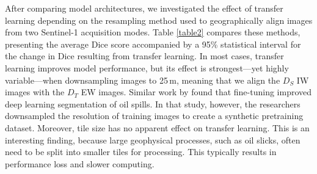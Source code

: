 \documentclass[lettersize,journal]{IEEEtran}
\begin{document}
After comparing model architectures, we investigated the effect of transfer learning depending on the resampling method used to geographically align images from two Sentinel-1 acquisition modes. Table \ref{table2} 
compares these methods, presenting the average Dice score accompanied by a 95\% statistical interval for the change in Dice resulting from transfer learning. In most cases, transfer learning improves model performance, 
but its effect is strongest—yet highly variable—when downsampling images to 25\,m, meaning that we align the $\mathit{D}_S$ IW images with the $\mathit{D}_T$ EW images. Similar work by 
\cite{bianchiLargeScaleDetectionCategorization2020a} found that fine-tuning improved deep learning segmentation of oil spills. In that study, however, the researchers downsampled the resolution of training images to create a 
synthetic pretraining dataset.
Moreover, tile size has no apparent effect on transfer learning. This is an interesting finding, because large geophysical processes, such as oil slicks, often need to be split into smaller tiles for processing. This 
typically results in performance loss and slower computing.
\end{document}
